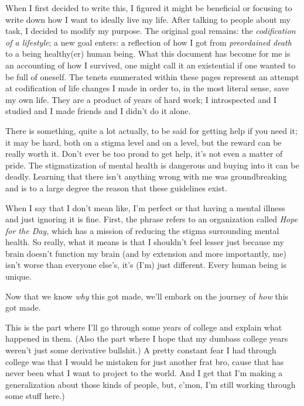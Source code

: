 \documentclass[./butidigress.tex]{subfiles}
\begin{document}
When I first decided to write this, I figured it might be beneficial or focusing to write down how I want to ideally live my life.
After talking to people about my task, I decided to modify my purpose.
The original goal remains: the \emph{codification of a lifestyle}; a new goal enters: a reflection of how I got from  \emph{preordained death} to a being healthy(er) human being.
What this document has become for me is an accounting of how I survived, one might call it an existential  if one wanted to be full of oneself.
The tenets enumerated within these pages represent an attempt at codification of life changes I made in order to, in the most literal sense, save my own life.
They are a product of years of hard work; I introspected and I studied and I made friends and I didn't do it alone.

There is something, quite a lot actually, to be said for getting help if you need it; it may be hard, both on a stigma level and on a  level, but the reward can be really worth it.
Don't ever be too proud to get help, it's not even a matter of pride.
The stigmatization of mental health is dangerous and buying into it can be deadly.
Learning that there isn't anything wrong with me was groundbreaking and is to a large degree the reason that these guidelines exist.

When I say that  I don't mean like, I'm perfect or that having a mental illness and just ignoring it is fine.
First, the phrase  refers to an organization called \textit{Hope for the Day,} which has a mission of reducing the stigma surrounding mental health.
So really, what it means is that I shouldn't feel lesser just because my brain doesn't function  my brain (and by extension and more importantly, me) isn't worse than everyone else's, it's (I'm) just different.
Every human being is unique.

Now that we know \emph{why} this got made, we'll embark on the journey of \emph{how} this got made.

\label{subsec:narrative}
This is the part where I'll go through some years of college and explain what happened in them.
(Also the part where I hope that my dumbass college years weren't just some derivative bullshit.)
A pretty constant fear I had through college was that I would be mistaken for just another frat bro, cause that has never been what I want to project to the world.
And I get that I'm making a generalization about those kinds of people, but, c'mon, I'm still working through some stuff here.)
\end{document}
